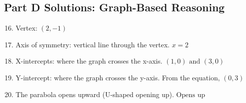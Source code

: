\documentclass[14pt]{extarticle}
\begin{document}
\subsection*{Part D Solutions: Graph-Based Reasoning}
\begin{enumerate}
  \setcounter{enumi}{15}
  \item Vertex: \(\boxed{(2, -1)}\)

  \item Axis of symmetry: vertical line through the vertex.  
  \(\boxed{x = 2}\)

  \item X-intercepts: where the graph crosses the x-axis.  
  \(\boxed{(1, 0) \text{ and } (3, 0)}\)

  \item Y-intercept: where the graph crosses the y-axis.  
  From the equation, \(\boxed{(0, 3)}\)

  \item The parabola opens upward (U-shaped opening up).  
  \(\boxed{\text{Opens up}}\)
\end{enumerate}
\end{document}
